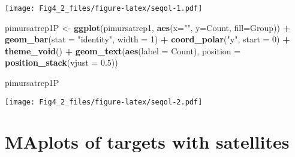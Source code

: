\documentclass[
]{article}
\newenvironment{Shaded}{\begin{snugshade}}{\end{snugshade}}
\newcommand{\AttributeTok}[1]{\textcolor[rgb]{0.13,0.29,0.53}{#1}}
\newcommand{\DecValTok}[1]{\textcolor[rgb]{0.00,0.00,0.81}{#1}}
\newcommand{\FloatTok}[1]{\textcolor[rgb]{0.00,0.00,0.81}{#1}}
\newcommand{\FunctionTok}[1]{\textcolor[rgb]{0.13,0.29,0.53}{\textbf{#1}}}
\newcommand{\NormalTok}[1]{#1}
\newcommand{\OtherTok}[1]{\textcolor[rgb]{0.56,0.35,0.01}{#1}}
\newcommand{\SpecialCharTok}[1]{\textcolor[rgb]{0.81,0.36,0.00}{\textbf{#1}}}
\newcommand{\StringTok}[1]{\textcolor[rgb]{0.31,0.60,0.02}{#1}}
\begin{document}
\texttt{[image: Fig4\_2\_files/figure-latex/seqol-1.pdf]}

\begin{Shaded}
\begin{Highlighting}[]
\NormalTok{pimursatrep1P }\OtherTok{\textless{}{-}} \FunctionTok{ggplot}\NormalTok{(pimursatrep1, }\FunctionTok{aes}\NormalTok{(}\AttributeTok{x=}\StringTok{""}\NormalTok{, }\AttributeTok{y=}\NormalTok{Count, }\AttributeTok{fill=}\NormalTok{Group)) }\SpecialCharTok{+} 
  \FunctionTok{geom\_bar}\NormalTok{(}\AttributeTok{stat =} \StringTok{"identity"}\NormalTok{, }\AttributeTok{width =} \DecValTok{1}\NormalTok{) }\SpecialCharTok{+}
  \FunctionTok{coord\_polar}\NormalTok{(}\StringTok{"y"}\NormalTok{, }\AttributeTok{start =} \DecValTok{0}\NormalTok{) }\SpecialCharTok{+}
  \FunctionTok{theme\_void}\NormalTok{() }\SpecialCharTok{+}
  \FunctionTok{geom\_text}\NormalTok{(}\FunctionTok{aes}\NormalTok{(}\AttributeTok{label =}\NormalTok{ Count),}
            \AttributeTok{position =} \FunctionTok{position\_stack}\NormalTok{(}\AttributeTok{vjust =} \FloatTok{0.5}\NormalTok{)) }

\NormalTok{pimursatrep1P}
\end{Highlighting}
\end{Shaded}

\texttt{[image: Fig4\_2\_files/figure-latex/seqol-2.pdf]}

\hypertarget{maplots-of-targets-with-satellites}{%
\section{MAplots of targets with
satellites}\label{maplots-of-targets-with-satellites}}
\end{document}
